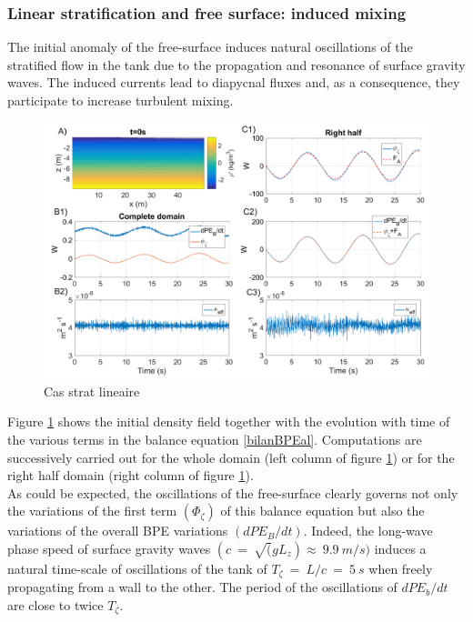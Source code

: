 \subsubsection{Linear stratification and free surface: induced mixing}
The initial anomaly of the free-surface induces natural oscillations of the stratified flow in the tank due to the propagation and resonance of surface gravity waves. The induced currents lead to diapycnal fluxes and, as a consequence, they participate to increase turbulent mixing.\\ 
\begin{figure}[h!]
\centering
\includegraphics[width=1\textwidth]{./CHAP_BPE/Fig_TANK_linS.png}
\caption{Cas strat lineaire}
\label{figClin}
\end{figure}
Figure \ref{figClin} shows the initial density field together with the evolution with time of the various terms in the balance equation \ref{bilanBPEal}. Computations are successively carried out for the whole domain (left column of figure \ref{figClin}) or for the right half domain (right column of figure \ref{figClin}).\\
As could be expected, the oscillations of the free-surface clearly governs not only the variations of the first term $(\Phi_{\zeta})$ of this balance equation but also the variations of the overall BPE variations $(dPE_B/dt)$. Indeed, the long-wave phase speed of surface gravity waves $(c\ =\ \sqrt(g L_z)\approx\ 9.9\ m/s)$ induces a natural time-scale of oscillations of the tank of $T_{\zeta}\ =\ L/c\ =\ 5\ s$ when freely propagating from a wall to the other. The period of the oscillations of $dPE_b/dt$ are close to twice $T_{\zeta}$.\\
